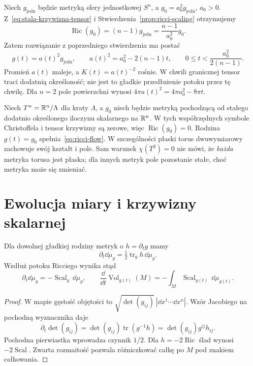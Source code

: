 \begin{przyklad}
\label{prz:ricci-sphere}
Niech $g_{\mathrm{jedn}}$ będzie metryką sfery jednostkowej
$S^n$, a $g_0=a_0^2g_{\mathrm{jedn}}$, $a_0>0$.
Z~\eqref{eq:stala-krzywizna-tensor} i
Stwierdzenia~\ref{prop:ricci-scaling} otrzymujemy
\[
 \operatorname{Ric}(g_0)
 =(n-1)g_{\mathrm{jedn}}
 =\frac{n-1}{a_0^2}g_0.
\]
Zatem rozwiązanie z poprzedniego stwierdzenia ma postać
\begin{equation}\label{eq:ricci-sphere}
 g(t)=a(t)^2g_{\mathrm{jedn}},\qquad
 a(t)^2=a_0^2-2(n-1)t,
 \qquad 0\leq t<\frac{a_0^2}{2(n-1)}.
\end{equation}
Promień $a(t)$ maleje, a $K(t)=a(t)^{-2}$ rośnie.
W chwili granicznej tensor traci dodatnią określoność;
nie jest to gładkie przedłużenie potoku przez tę chwilę.
Dla $n=2$ pole powierzchni wynosi
$4\pi a(t)^2=4\pi a_0^2-8\pi t$.
\end{przyklad}

\begin{przyklad}
\label{prz:ricci-torus}
Niech $T^n=\mathbb{R}^n/\Lambda$ dla kraty $\Lambda$,
a $g_0$ niech będzie metryką pochodzącą od stałego
dodatnio określonego iloczynu skalarnego na $\mathbb{R}^n$.
W tych współrzędnych symbole Christoffela i tensor
krzywizny są zerowe, więc $\operatorname{Ric}(g_0)=0$.
Rodzina $g(t)=g_0$ spełnia~\eqref{eq:ricci-flow}.
W szczególności płaski torus dwuwymiarowy zachowuje
swój kształt i pole. Sam warunek $\chi(T^2)=0$ nie mówi,
że \emph{każda} metryka torusa jest płaska; dla innych
metryk pole pozostanie stałe, choć metryka może się
zmieniać.
\end{przyklad}

\section{Ewolucja miary i krzywizny skalarnej}
\label{sec:ricci-evolution}

\begin{stwierdzenie}
\label{prop:ricci-volume}
Dla dowolnej gładkiej rodziny metryk o
$h=\partial_tg$ mamy
\[
 \partial_t\dd\mu_g
   =\tfrac12\operatorname{tr}_g h\,\dd\mu_g.
\]
Wzdłuż potoku Ricciego wynika stąd
\begin{equation}\label{eq:ricci-volume}
 \partial_t\dd\mu_g=-\operatorname{Scal}_g\,\dd\mu_g,
 \qquad
 \frac{\dd}{\dd t}\operatorname{Vol}_{g(t)}(M)
 =-\int_M\operatorname{Scal}_{g(t)}\,\dd\mu_{g(t)}.
\end{equation}
\end{stwierdzenie}
\begin{proof}
W mapie gęstość objętości to
$\sqrt{\det(g_{ij})}\,|\dd x^1\cdots\dd x^n|$.
Wzór Jacobiego na pochodną wyznacznika daje
\[
 \partial_t\det(g_{ij})
 =\det(g_{ij})\operatorname{tr}(g^{-1}h)
 =\det(g_{ij})g^{ij}h_{ij}.
\]
Pochodna pierwiastka wprowadza czynnik $1/2$.
Dla $h=-2\operatorname{Ric}$ ślad wynosi
$-2\operatorname{Scal}$. Zwarta rozmaitość pozwala
różniczkować całkę po $M$ pod znakiem całkowania.
\end{proof}

